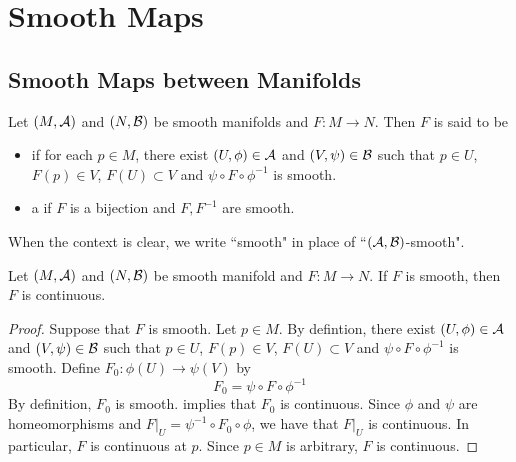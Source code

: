 \documentclass{book}
\begin{document}
\newpage 
\chapter{Smooth Maps}

\section{Smooth Maps between Manifolds}

\begin{note}
\end{note}

\begin{defn} 
	Let $(M, \mathcal{A})$ and $(N, \mathcal{B})$ be smooth manifolds and $F: M \rightarrow N$. Then $F$ is said to be 
	\begin{itemize}
		\item {} if for each $p \in M$, there exist $(U, \phi) \in \mathcal{A}$ and $(V, \psi) \in \mathcal{B}$ such that $p \in U$, $F(p) \in V$, $F(U) \subset V$ and $\psi \circ F \circ \phi^{-1}$ is smooth. 
		\item a  if $F$ is a bijection and $F,F^{-1}$ are smooth. 
	\end{itemize}
\end{defn}

\begin{note}
	When the context is clear, we write ``smooth" in place of ``$(\mathcal{A}, \mathcal{B})$-smooth". 
\end{note}

\begin{ex} 
	Let $(M, \mathcal{A})$ and $(N, \mathcal{B})$ be smooth manifold and $F: M \rightarrow N$. If $F$ is smooth, then $F$ is continuous. 
\end{ex}

\begin{proof}
	Suppose that $F$ is smooth. Let $p \in M$. By defintion, there exist $(U, \phi) \in \mathcal{A}$ and $(V, \psi) \in \mathcal{B}$ such that $p \in U$, $F(p) \in V$, $F(U) \subset V$ and $\psi \circ F \circ \phi^{-1}$ is smooth. Define $F_0: \phi(U) \rightarrow \psi(V) $ by $$ F_0 = \psi \circ F \circ \phi^{-1}$$  
	By definition, $F_0$ is smooth.  implies that $F_0$ is continuous. Since $\phi$ and $\psi$ are homeomorphisms and $F|_{U} = \psi^{-1} \circ F_0 \circ \phi$, we have that $F|_{U}$ is continuous. In particular, $F$ is continuous at $p$. Since $p \in M$ is arbitrary, $F$ is continuous.
\end{proof}
\end{document}
